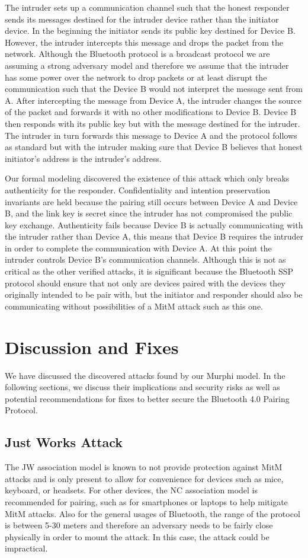 \documentclass{acm_proc_article-sp}
\begin{document}
The intruder sets up a communication channel such that the honest responder sends its messages destined for the intruder device rather than the initiator device. In the beginning the initiator sends its public key destined for Device B. However, the intruder intercepts this message and drops the packet from the network. Although the Bluetooth protocol is a broadcast protocol we are assuming a strong adversary model and therefore we assume that the intruder has some power over the network to drop packets or at least disrupt the communication such that the Device B would not interpret the message sent from A. After intercepting the message from Device A, the intruder changes the source of the packet and forwards it with no other modifications to Device B. Device B then responds with its public key but with the message destined for the intruder. The intruder in turn forwards this message to Device A and the protocol follows as standard but with the intruder making sure that Device B believes that honest initiator's address is the intruder's address.

Our formal modeling discovered the existence of this attack which only breaks authenticity for the responder. Confidentiality and intention preservation invariants are held because the pairing still occurs between Device A and Device B, and the link key is secret since the intruder has not compromised the public key exchange. Authenticity fails because Device B is actually communicating with the intruder rather than Device A, this means that Device B requires the intruder in order to complete the communication with Device A. At this point the intruder controls Device B's communication channels. Although this is not as critical as the other verified attacks, it is significant because the Bluetooth SSP protocol should ensure that not only are devices paired with the devices they originally intended to be pair with, but the initiator and responder should also be communicating without possibilities of a MitM attack such as this one.

\section{Discussion and Fixes}
We have discussed the discovered attacks found by our Murphi model. In the following sections, we discuss their implications and security risks as well as potential recommendations for fixes to better secure the Bluetooth 4.0 Pairing Protocol.

\subsection{Just Works Attack}
The JW association model is known to not provide protection against MitM attacks and is only present to allow for convenience for devices such as mice, keyboard, or headsets. For other devices, the NC association model is recommended for pairing, such as for smartphones or laptops to help mitigate MitM attacks. Also for the general usages of Bluetooth, the range of the protocol is between 5-30 meters and therefore an adversary needs to be fairly close physically in order to mount the attack. In this case, the attack could be impractical.
\end{document}
